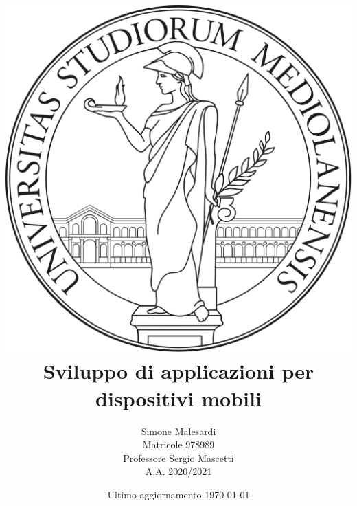 \title{
    \vspace{0.5in}
    \includegraphics[scale=0.1]{images/logo.png}\\
    \textbf{Sviluppo di applicazioni per dispositivi mobili}
}
\author{
    \vspace{0.1in}
    Simone Malesardi \\
    \vspace{0.1in}
    Matricole 978989 \\
    \vspace{0.1in}
    Professore Sergio Mascetti \\
    \vspace{0.5in}
    A.A. 2020/2021 
}
\date{Ultimo aggiornamento \today}

\newcommand{\myparagraph}[1]{\paragraph{#1}\mbox{}\\}
\renewcommand\labelitemi{\tiny$\bullet$} %
\renewcommand{\contentsname}{Indice}

\hypersetup{
    colorlinks,
    citecolor=black,
    filecolor=black,
    linkcolor=black,
    urlcolor=black
}

